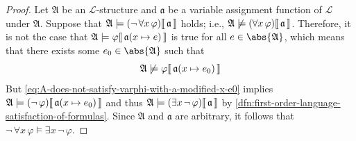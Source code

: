 \begin{proof}
    Let \( \mathfrak{A} \) be an \( \mathcal{L} \)-structure and \( \mathfrak{a} \) be a variable assignment function of \( \mathcal{L} \) under \( \mathfrak{A} \).
    Suppose that \( \folwffsatisfaction{\mathfrak{A}}{\mleft( \lnot \, \forall x \, \varphi \mright)}{\mathfrak{a}} \) holds; i.e.,
    \( \folwffnonsatisfaction{\mathfrak{A}}{\mleft( \forall x \, \varphi \mright)}{\mathfrak{a}} \).
    Therefore, it is not the case that \( \folwffsatisfaction{\mathfrak{A}}{\varphi}{ \folmodifiedvariableassignmentfunction{\mathfrak{a}}{x}{e} } \) is true
    for all \( e \in \abs{\mathfrak{A}} \), which means that there exists some \( e_{0} \in \abs{\mathfrak{A}} \) such that
    \begin{equation}
        \label{eq:A-does-not-satisfy-varphi-with-a-modified-x-e0}
        \folwffnonsatisfaction{\mathfrak{A}}{\varphi}{ \folmodifiedvariableassignmentfunction{\mathfrak{a}}{x}{e_{0}} }
    \end{equation}
    But \eqref{eq:A-does-not-satisfy-varphi-with-a-modified-x-e0} implies
    \( \folwffsatisfaction{\mathfrak{A}}{\mleft( \lnot \, \varphi \mright)}{ \folmodifiedvariableassignmentfunction{\mathfrak{a}}{x}{e_{0}} } \)
    and thus \( \folwffsatisfaction{\mathfrak{A}}{\mleft( \exists x \, \lnot \, \varphi \mright)}{\mathfrak{a}} \)
    by \cref{dfn:first-order-language-satisfaction-of-formulas}.
    Since \( \mathfrak{A} \) and \( \mathfrak{a} \) are arbitrary, it follows that \( \lnot \, \forall x \, \varphi \models \exists x \, \lnot \, \varphi \).


\end{proof}
